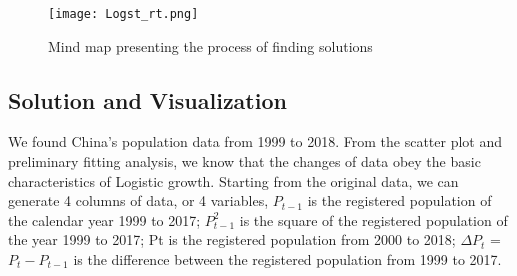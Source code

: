 \documentclass[12pt]{article}  %
\begin{document}
\begin{figure}[H]
	\centering
	\texttt{[image: Logst\_rt.png]}
	\caption{Mind map presenting the process of finding solutions}\label{fig:Logst_rt}
\end{figure}
\subsection{Solution and Visualization}
We found China's population data from 1999 to 2018. From the scatter plot and preliminary fitting analysis, we know that the changes of data obey the basic characteristics of Logistic growth. Starting from the original data, we can generate 4 columns of data, or 4 variables, ${P_{t-1}}$ is the registered population of the calendar year 1999 to 2017; ${P_{t-1}^{2}}$ is the square of the registered population of the year 1999 to 2017; Pt is the registered population from 2000 to 2018; ${\Delta P_{t}}$ = ${P_{t}-P_{t-1}}$ is the difference between the registered population from 1999 to 2017.
\end{document}
